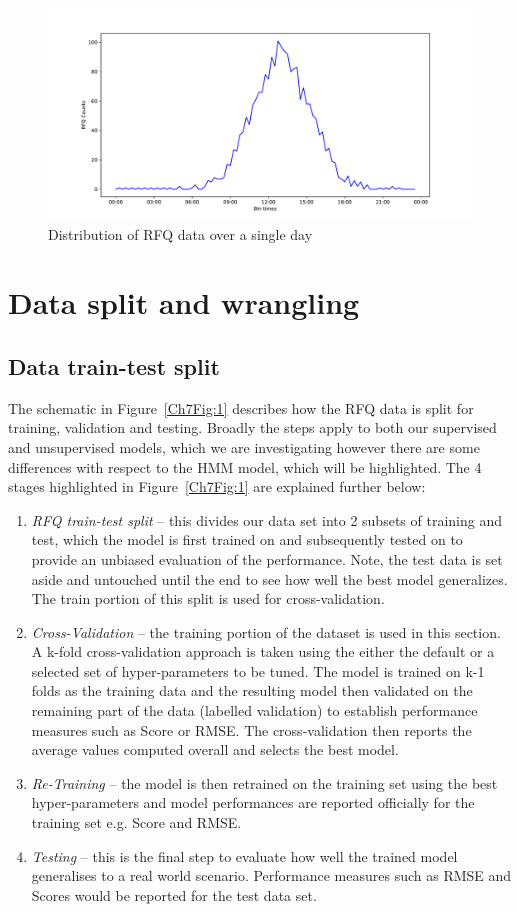 \begin{figure}[!ht]\centering
    \includegraphics[width=0.8\linewidth]{./figures/Ch6fig4.pdf}
    \caption{Distribution of RFQ data over a single day}\label{Ch6Fig:4}
\end{figure}

\section{Data split and wrangling}\label{splitwrangle}
\subsection{Data train-test split}\label{train-testsplit}
The schematic in Figure~\ref{Ch7Fig:1} describes how the RFQ data is split for training, validation and testing. Broadly the steps apply to both our supervised and unsupervised models, which we are investigating however there are some differences with respect to the HMM model, which will be highlighted. The 4 stages highlighted in Figure~\ref{Ch7Fig:1} are explained further below:
\begin{enumerate}
    \item \textit{RFQ train-test split} -- this divides our data set into 2 subsets of training and test, which the model is first trained on and subsequently tested on to provide an unbiased evaluation of the performance. Note, the test data is set aside and untouched until the end to see how well the best model generalizes. The train portion of this split is used for cross-validation.
    \item \textit{Cross-Validation} -- the training portion of the dataset is used in this section. A k-fold cross-validation approach is taken using the either the default or a selected set of hyper-parameters to be tuned. The model is trained on k-1 folds as the training data and the resulting model then validated on the remaining part of the data (labelled validation) to establish performance measures such as Score or RMSE. The cross-validation then reports the average values computed overall and selects the best model.
    \item \textit{Re-Training} -- the model is then retrained on the training set using the best hyper-parameters and model performances are reported officially for the training set e.g. Score and RMSE.
    \item \textit{Testing} -- this is the final step to evaluate how well the trained model generalises to a real world scenario. Performance measures such as RMSE and Scores would be reported for the test data set.
\end{enumerate}

